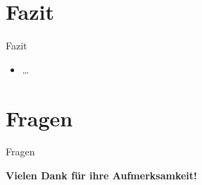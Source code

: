 \section{Fazit}
\begin{frame}{Fazit}
\begin{itemize}
  \item \dots
\end{itemize}
\end{frame} 

\section{Fragen}
\begin{frame}{Fragen}
\begin{minipage}{\textwidth}
  \begin{center}
    \Huge \textbf{Vielen Dank für ihre Aufmerksamkeit!}
    \vspace{1cm}
  \end{center}
\end{minipage}
\begin{minipage}{\textwidth}
  \begin{center}
  \end{center}
\end{minipage}
\end{frame}



